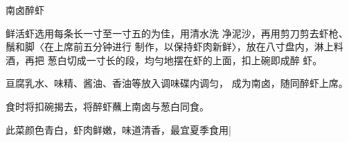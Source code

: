 \begin{recipe}{南卤醉虾}

\ingredients


\cooking

\step 	鲜活虾选用每条长一寸至一寸五的为佳，用清水洗 净泥沙，再用剪刀剪去虾枪、鬚和脚〈在上席前五分钟进行 制作，以保持虾肉新鲜〉，放在八寸盘内，淋上料酒，再把 葱白切成一寸长的段，均勻地摆在虾的上面，扣上碗即成醉 虾。

\step 	亘腐乳水、味精、酱油、香油等放入调味碟内调匀， 成为南卤，随同醉虾上席。

\step 食时将扣碗揭去，将醉虾蘸上南卤与葱白同食。

\notes

此菜颜色青白，虾肉鲜嫩，味道清香，最宜夏季食用|

\end{recipe}

